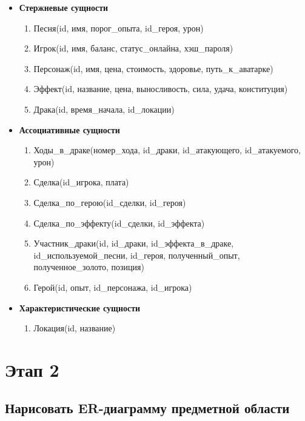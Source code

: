 \begin{itemize}
\item \textbf{Стержневые сущности}
\begin{enumerate}
    \item Песня(id, имя, порог\_опыта, id\_героя, урон)
    \item Игрок(id, имя, баланс, статус\_онлайна, хэш\_пароля)
    \item Персонаж(id, имя, цена, стоимость, здоровье, путь\_к\_аватарке)
    \item Эффект(id, название, цена, выносливость, сила, удача, конституция)
    \item Драка(id, время\_начала, id\_локации)
\end{enumerate}

\item \textbf{Ассоциативные сущности}
\begin{enumerate}
    \item Ходы\_в\_драке(номер\_хода, id\_драки, id\_атакующего, id\_атакуемого, урон)
    \item Сделка(id\_игрока, плата)
    \item Сделка\_по\_герою(id\_сделки, id\_героя)
    \item Сделка\_по\_эффекту(id\_сделки, id\_эффекта)
    \item Участник\_драки(id, id\_драки, id\_эффекта\_в\_драке, id\_используемой\_песни, id\_героя, полученный\_опыт, полученное\_золото, позиция)
    \item Герой(id, опыт, id\_персонажа, id\_игрока)
\end{enumerate}

\item \textbf{Характеристические сущности}
\begin{enumerate}
    \item Локация(id, название)
\end{enumerate}
\end{itemize}

\section*{Этап 2}


\subsection*{Нарисовать ER-диаграмму предметной области}

